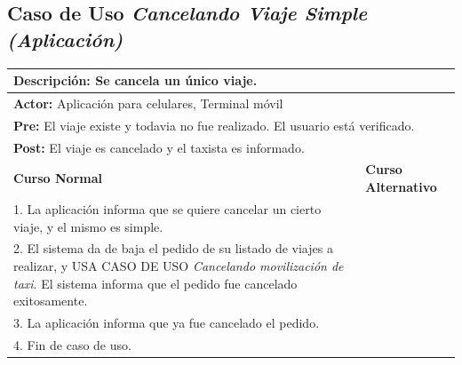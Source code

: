 \documentclass[a4paper]{article}
\begin{document}
\subsection{Caso de Uso \textit{Cancelando Viaje Simple (Aplicaci\'on)}}
\begin{center}
\begin{tabular}{|p{10cm} | p{6cm}|}
\hline
\multicolumn{2}{|p{16cm}|}{\textbf{Descripci\'on:} Se cancela un \'unico viaje. } \\
\hline
\multicolumn{2}{|l|}{\textbf{Actor:} Aplicaci\'on para celulares, Terminal m\'ovil} \\
\hline
\multicolumn{2}{|l|}{\textbf{Pre:} El viaje existe y todavia no fue realizado. El usuario est\'a verificado.} \\
\hline
\multicolumn{2}{|p{16cm}|}{\textbf{Post:} El viaje es cancelado y el taxista es informado.}\\
\hline
\textbf{Curso Normal}  & \textbf{Curso Alternativo} \\ \hline
1. La aplicaci\'on informa que se quiere cancelar un cierto viaje, y el mismo es simple. & \\ \hline
2. El sistema da de baja el pedido de su listado de viajes a realizar, y USA CASO DE USO \textit{Cancelando movilizaci\'on de taxi}. El sistema informa que el pedido fue cancelado exitosamente. & \\ \hline
3. La aplicaci\'on informa que ya fue cancelado el pedido. & \\ \hline
4. Fin de caso de uso. & \\ \hline
\end{tabular}
\end{center}
\end{document}
